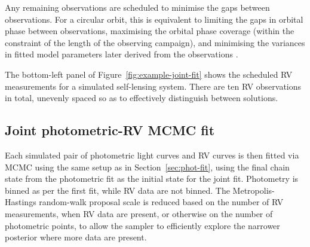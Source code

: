 \documentclass[fleqn,usenatbib]{mnras}
\begin{document}
Any remaining observations are scheduled to minimise the gaps between observations. For a circular orbit, this is equivalent to limiting the gaps in orbital phase between observations, maximising the orbital phase coverage (within the constraint of the length of the observing campaign), and minimising the variances in fitted model parameters later derived from the observations \citep{koen_how_2024}.

The bottom-left panel of Figure~\ref{fig:example-joint-fit} shows the scheduled RV measurements for a simulated self-lensing system. There are ten RV observations in total, unevenly spaced so as to effectively distinguish between solutions.

\subsection{Joint photometric-RV MCMC fit} \label{sec:fitting}

Each simulated pair of photometric light curves and RV curves is then fitted via MCMC using the same setup as in Section~\ref{sec:phot-fit}, using the final chain state from the photometric fit as the initial state for the joint fit. Photometry is binned as per the first fit, while RV data are not binned. The Metropolis-Hastings random-walk proposal scale is reduced based on the number of RV measurements, when RV data are present, or otherwise on the number of photometric points, to allow the sampler to efficiently explore the narrower posterior where more data are present.
\end{document}
